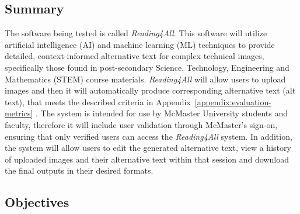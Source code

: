 \documentclass[12pt, titlepage]{article}
\begin{document}
\subsection{Summary}

The software being tested is called \textit{Reading4All}. This
software will utilize artificial intelligence (AI) and machine
learning (ML) techniques to provide detailed, context-informed
alternative text for complex technical images, specifically those
found in post-secondary Science, Technology, Engineering and Mathematics (STEM)
course materials. \textit{Reading4All} will allow users to upload
images and then it will automatically produce corresponding alternative text (alt text), that
meets the described criteria in Appendix~\ref{appendix:evaluation-metrics} . The system is intended for use by
McMaster University students and faculty, therefore it will include
user validation through McMaster's sign-on, ensuring that only
verified users can access the \textit{Reading4All} system.
In addition, the system will allow users to edit the generated
alternative text, view a history of uploaded images and their
alternative text within that session and download the final outputs
in their desired formats.

\subsection{Objectives}




\end{document}
